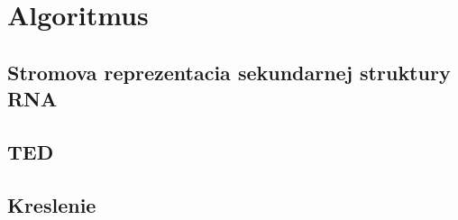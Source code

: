 
\chapter{Algoritmus}


\section{Stromova reprezentacia sekundarnej struktury RNA}

\section{TED}

\section{Kreslenie}

